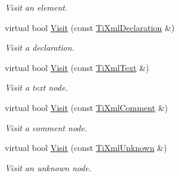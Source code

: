 \begin{DoxyCompactItemize}
\begin{DoxyCompactList}\small\item\em \-Visit an element. \end{DoxyCompactList}\item 
\hypertarget{class_ti_xml_visitor_afad71c71ce6473fb9b4b64cd92de4a19}{
virtual bool \hyperlink{class_ti_xml_visitor_afad71c71ce6473fb9b4b64cd92de4a19}{\-Visit} (const \hyperlink{class_ti_xml_declaration}{\-Ti\-Xml\-Declaration} \&)}
\label{class_ti_xml_visitor_afad71c71ce6473fb9b4b64cd92de4a19}

\begin{DoxyCompactList}\small\item\em \-Visit a declaration. \end{DoxyCompactList}\item 
\hypertarget{class_ti_xml_visitor_a399b8ebca5cd14664974a32d2ce029e5}{
virtual bool \hyperlink{class_ti_xml_visitor_a399b8ebca5cd14664974a32d2ce029e5}{\-Visit} (const \hyperlink{class_ti_xml_text}{\-Ti\-Xml\-Text} \&)}
\label{class_ti_xml_visitor_a399b8ebca5cd14664974a32d2ce029e5}

\begin{DoxyCompactList}\small\item\em \-Visit a text node. \end{DoxyCompactList}\item 
\hypertarget{class_ti_xml_visitor_a53a60e7a528627b31af3161972cc7fa2}{
virtual bool \hyperlink{class_ti_xml_visitor_a53a60e7a528627b31af3161972cc7fa2}{\-Visit} (const \hyperlink{class_ti_xml_comment}{\-Ti\-Xml\-Comment} \&)}
\label{class_ti_xml_visitor_a53a60e7a528627b31af3161972cc7fa2}

\begin{DoxyCompactList}\small\item\em \-Visit a comment node. \end{DoxyCompactList}\item 
\hypertarget{class_ti_xml_visitor_a7e284d607d275c51dac1adb58159ce28}{
virtual bool \hyperlink{class_ti_xml_visitor_a7e284d607d275c51dac1adb58159ce28}{\-Visit} (const \hyperlink{class_ti_xml_unknown}{\-Ti\-Xml\-Unknown} \&)}
\label{class_ti_xml_visitor_a7e284d607d275c51dac1adb58159ce28}

\begin{DoxyCompactList}\small\item\em \-Visit an unknown node. \end{DoxyCompactList}\end{DoxyCompactItemize}



